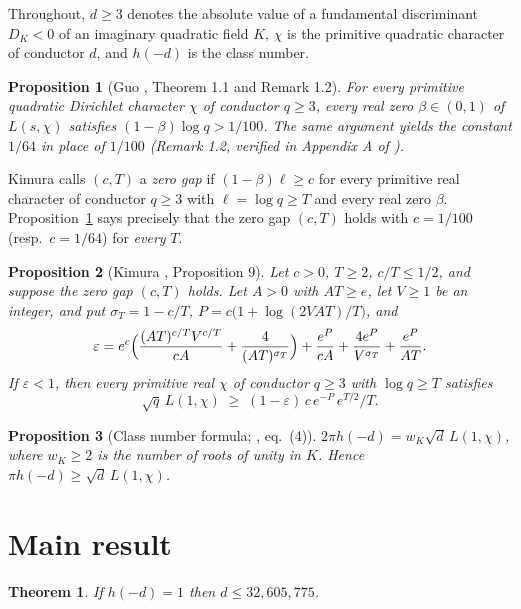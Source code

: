 \documentclass[11pt]{article}
\newtheorem{theorem}{Theorem}
\newtheorem{proposition}{Proposition}
\begin{document}
Throughout, $d \ge 3$ denotes the absolute value of a fundamental
discriminant $D_K < 0$ of an imaginary quadratic field $K$, $\chi$ is the
primitive quadratic character of conductor $d$, and $h(-d)$ is the class
number.

\begin{proposition}[Guo \cite{guo}, Theorem 1.1 and Remark 1.2]
\label{prop:guo}
For every primitive quadratic Dirichlet character $\chi$ of conductor
$q \ge 3$, every real zero $\beta \in (0,1)$ of $L(s,\chi)$ satisfies
$(1-\beta)\log q > 1/100$. The same argument yields the constant $1/64$ in
place of $1/100$ \textup{(}Remark 1.2, verified in Appendix A of
\cite{guo}\textup{)}.
\end{proposition}

Kimura \cite{kimura} calls $(c,T)$ a \emph{zero gap} if
$(1-\beta)\ell \ge c$ for every primitive real character of conductor
$q \ge 3$ with $\ell = \log q \ge T$ and every real zero $\beta$.
Proposition~\ref{prop:guo} says precisely that the zero gap $(c,T)$ holds
with $c = 1/100$ (resp.\ $c = 1/64$) for \emph{every} $T$.

\begin{proposition}[Kimura \cite{kimura}, Proposition 9]
\label{prop:kimura}
Let $c > 0$, $T \ge 2$, $c/T \le 1/2$, and suppose the zero gap $(c,T)$
holds. Let $A > 0$ with $AT \ge e$, let $V \ge 1$ be an integer, and put
$\sigma_T = 1 - c/T$, $P = c\bigl(1 + \log(2VAT)/T\bigr)$, and
\[
\varepsilon
= e^{c}\Bigl(\frac{(AT)^{c/T} V^{c/T}}{cA}
+ \frac{4}{(AT)^{\sigma_T}}\Bigr)
+ \frac{e^{P}}{cA}
+ \frac{4e^{P}}{V^{\sigma_T}}
+ \frac{e^{P}}{AT}.
\]
If $\varepsilon < 1$, then every primitive real $\chi$ of conductor
$q \ge 3$ with $\log q \ge T$ satisfies
\[
\sqrt{q}\, L(1,\chi) \;\ge\; (1-\varepsilon)\, c\, e^{-P}\, e^{T/2}/T.
\]
\end{proposition}

\begin{proposition}[Class number formula; \cite{kimura}, eq.\ (4)]
\label{prop:cnf}
$2\pi h(-d) = w_K \sqrt{d}\, L(1,\chi)$, where $w_K \ge 2$ is the number of
roots of unity in $K$. Hence $\pi h(-d) \ge \sqrt{d}\, L(1,\chi)$.
\end{proposition}

\section{Main result}

\begin{theorem}
\label{thm:main}
If $h(-d) = 1$ then $d \le 32{,}605{,}775$.
\end{theorem}
\end{document}
